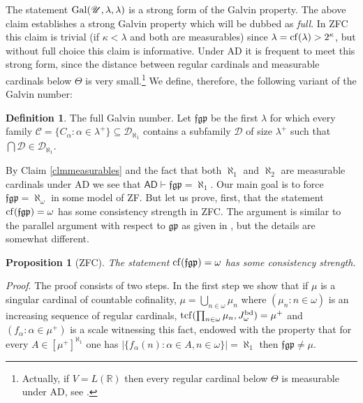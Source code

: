\documentclass[11pt]{amsart}
\newtheorem{proposition}[theorem]{Proposition}
\theoremstyle{definition}
\newtheorem{definition}[theorem]{Definition}
\theoremstyle{remark}
\newcommand{\cf}{{\rm cf}}
\begin{document}
The statement ${\rm Gal}(\mathscr{U},\lambda,\lambda)$ is a strong form of the Galvin property.
The above claim establishes a strong Galvin property which will be dubbed as \emph{full}.
In \textsf{ZFC} this claim is trivial (if $\kappa<\lambda$ and both are measurables) since $\lambda=\cf(\lambda)>2^\kappa$, but without full choice this claim is informative.
Under \textsf{AD} it is frequent to meet this strong form, since the distance between regular cardinals and measurable cardinals below $\Theta$ is very small.\footnote{Actually, if $V=L(\mathbb{R})$ then every regular cardinal below $\Theta$ is measurable under \textsf{AD}, see \cite{MR2768698}.}
We define, therefore, the following variant of the Galvin number:

\begin{definition} \label{deffgp}
  The full Galvin number. \newline
  Let $\mathfrak{fgp}$ be the first $\lambda$ for which every family $\mathcal{C}=\{C_\alpha:\alpha\in\lambda^+\}\subseteq\mathscr{D}_{\aleph_1}$ contains a subfamily $\mathcal{D}$ of size $\lambda^+$ such that $\bigcap\mathcal{D}\in\mathscr{D}_{\aleph_1}$.
\end{definition}

By Claim \ref{clmmeasurables} and the fact that both $\aleph_1$ and $\aleph_2$ are measurable cardinals under \textsf{AD} we see that $\textsf{AD}\vdash\mathfrak{fgp}=\aleph_1$.
Our main goal is to force $\mathfrak{fgp}=\aleph_\omega$ in some model of \textsf{ZF}.
But let us prove, first, that the statement $\cf(\mathfrak{fgp})=\omega$ has some consistency strength in \textsf{ZFC}.
The argument is similar to the parallel argument with respect to $\mathfrak{gp}$ as given in \cite{MR4423479}, but the details are somewhat different.

\begin{proposition}[ZFC] \label{propfgpstrength}
  The statement $\cf(\mathfrak{fgp})=\omega$ has some consistency strength.
\end{proposition}

\par\noindent\emph{Proof}. \newline
The proof consists of two steps.
In the first step we show that if $\mu$ is a singular cardinal of countable cofinality, $\mu=\bigcup_{n\in\omega}\mu_n$ where $(\mu_n:n\in\omega)$ is an increasing sequence of regular cardinals, ${\rm tcf}(\prod_{n\in\omega}\mu_n,J^{\rm bd}_\omega)=\mu^+$ and $(f_\alpha:\alpha\in\mu^+)$ is a scale witnessing this fact, endowed with the property that for every $A\in[\mu^+]^{\aleph_1}$ one has $|\{f_\alpha(n):\alpha\in{A}, n\in\omega\}|=\aleph_1$ then $\mathfrak{fgp}\neq\mu$.
\end{document}
